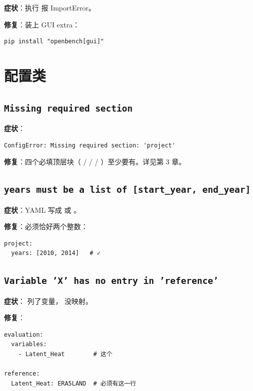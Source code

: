 \textbf{症状}：执行  报 ImportError。

\textbf{修复}：装上 GUI extra：

\begin{verbatim}
pip install "openbench[gui]"
\end{verbatim}

\section{配置类}

\subsection{\texttt{Missing required section}}

\textbf{症状}：

\begin{verbatim}
ConfigError: Missing required section: 'project'
\end{verbatim}

\textbf{修复}：四个必填顶层块（ /  /  / ）至少要有。详见第 3 章。

\subsection{\texttt{years must be a list of [start\_year, end\_year]}}

\textbf{症状}：YAML 写成  或 。

\textbf{修复}：必须恰好两个整数：

\begin{verbatim}
project:
  years: [2010, 2014]   # ✓
\end{verbatim}

\subsection{\texttt{Variable 'X' has no entry in 'reference'}}

\textbf{症状}： 列了变量， 没映射。

\textbf{修复}：

\begin{verbatim}
evaluation:
  variables:
    - Latent_Heat        # 这个

reference:
  Latent_Heat: ERA5LAND  # 必须有这一行
\end{verbatim}

